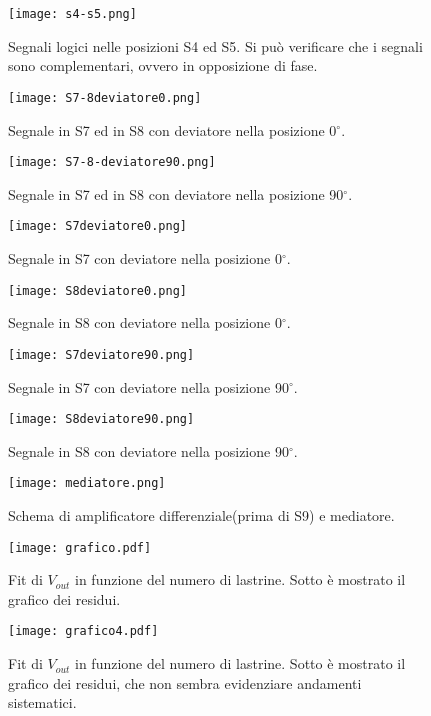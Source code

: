 \begin{figure}[h]
	\centering
	\texttt{[image: s4-s5.png]}
	\caption{Segnali logici nelle posizioni S4 ed S5. Si può verificare che i segnali sono complementari, ovvero in opposizione di fase.}
	\label{f:s4-s5}
\end{figure}

\begin{figure}[h]
	\centering
	\texttt{[image: S7-8deviatore0.png]}
	\caption{Segnale in S7 ed in S8 con deviatore nella posizione 0$^\circ$.}
	\label{f:S7-8deviatore0}
\end{figure}

\begin{figure}[h]
	\centering
	\texttt{[image: S7-8-deviatore90.png]}
	\caption{Segnale in S7 ed in S8 con deviatore nella posizione 90$^\circ$.}
	\label{f:S7-8deviatore90}
\end{figure}

\begin{figure}[h]
	\centering
	\texttt{[image: S7deviatore0.png]}
	\caption{Segnale in S7 con deviatore nella posizione 0$^\circ$.}
	\label{f:S7deviatore0}
\end{figure}

\begin{figure}[h]
	\centering
	\texttt{[image: S8deviatore0.png]}
	\caption{Segnale in S8 con deviatore nella posizione 0$^\circ$.}
	\label{f:S8deviatore0}
\end{figure}

\begin{figure}[h]
	\centering
	\texttt{[image: S7deviatore90.png]}
	\caption{Segnale in S7 con deviatore nella posizione 90$^\circ$.}
	\label{f:S7deviatore90}
\end{figure}



\begin{figure}[h]
	\centering
	\texttt{[image: S8deviatore90.png]}
	\caption{Segnale in S8 con deviatore nella posizione 90$^\circ$.}
	\label{f:S8deviatore90}
\end{figure}

\begin{figure}[h]
	\centering
	\texttt{[image: mediatore.png]}
	\caption{Schema di amplificatore differenziale(prima di S9) e mediatore.}
	\label{f:Mediatore}
\end{figure}

\begin{figure}[h]
	\centering
	\texttt{[image: grafico.pdf]}
	\caption{Fit di $V_{out}$ in funzione del numero di lastrine. Sotto è mostrato il grafico dei residui.}
	\label{f:Grafico}
\end{figure}
\begin{figure}[h]
	\centering
	\texttt{[image: grafico4.pdf]}
	\caption{Fit di $V_{out}$ in funzione del numero di lastrine. Sotto è mostrato il grafico dei residui, che non sembra evidenziare andamenti sistematici.}
	\label{f:Grafico4}
\end{figure}